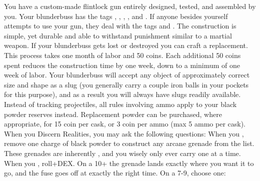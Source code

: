 \documentclass[darkmode]{dw_playbook}
\begin{document}
    {
            {You have a custom-made flintlock gun entirely designed, tested, and assembled by you.  Your blunderbuss has the tags , , , , and .  If anyone besides yourself attempts to use your gun, they deal with the tags  and .  
            \gap
            The construction is simple, yet durable and able to withstand punishment similar to a martial weapon.  If your blunderbuss gets lost or destroyed you can craft a replacement.  This process takes one month of labor and 50 coins.  Each additional 50 coins spent reduces the construction time by one week, down to a minimum of one week of labor.
            \gap
            Your blunderbuss will accept any object of approximately correct size and shape as a slug (you generally carry a couple iron balls in your pockets for this purpose), and as a result you will always have slugs readily available.  Instead of tracking projectiles, all rules involving ammo apply to your black powder reserves instead.  Replacement powder can be purchased, where appropriate, for 15 coin per cask, or 3 coin per ammo (max 5 ammo per cask).}
        \gap
            {When you Discern Realities, you may ask the following questions:
            \gapSm
            \gapSm
            }
            {When you , remove one charge of black powder to construct any arcane grenade from the list. These grenades are inherently , and you wisely only ever carry one at a time.
            \gapSm
            \gapSm
            \gapSm
            }
        \gap
            {When you , roll+DEX.  On a 10+ the grenade lands exactly where you want it to go, and the fuse goes off at exactly the right time.  On a 7-9, choose one:
            \gapSm
            \gapSm
            }
    }
\end{document}
